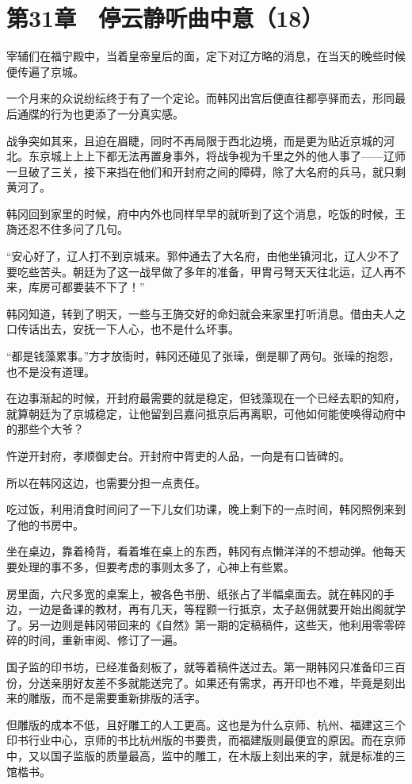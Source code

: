 \section{第31章　停云静听曲中意（18）}

宰辅们在福宁殿中，当着皇帝皇后的面，定下对辽方略的消息，在当天的晚些时候便传遍了京城。

一个月来的众说纷纭终于有了一个定论。而韩冈出宫后便直往都亭驿而去，形同最后通牒的行为也更添了一分真实感。

战争突如其来，且迫在眉睫，同时不再局限于西北边境，而是更为贴近京城的河北。东京城上上上下都无法再置身事外，将战争视为千里之外的他人事了——辽师一旦破了三关，接下来挡在他们和开封府之间的障碍，除了大名府的兵马，就只剩黄河了。

韩冈回到家里的时候，府中内外也同样早早的就听到了这个消息，吃饭的时候，王旖还忍不住多问了几句。

“安心好了，辽人打不到京城来。郭仲通去了大名府，由他坐镇河北，辽人少不了要吃些苦头。朝廷为了这一战早做了多年的准备，甲胄弓弩天天往北运，辽人再不来，库房可都要装不下了！”

韩冈知道，转到了明天，一些与王旖交好的命妇就会来家里打听消息。借由夫人之口传话出去，安抚一下人心，也不是什么坏事。

“都是钱藻累事。”方才放衙时，韩冈还碰见了张璪，倒是聊了两句。张璪的抱怨，也不是没有道理。

在边事渐起的时候，开封府最需要的就是稳定，但钱藻现在一个已经去职的知府，就算朝廷为了京城稳定，让他留到吕嘉问抵京后再离职，可他如何能使唤得动府中的那些个大爷？

忤逆开封府，孝顺御史台。开封府中胥吏的人品，一向是有口皆碑的。

所以在韩冈这边，也需要分担一点责任。

吃过饭，利用消食时间问了一下儿女们功课，晚上剩下的一点时间，韩冈照例来到了他的书房中。

坐在桌边，靠着椅背，看着堆在桌上的东西，韩冈有点懒洋洋的不想动弹。他每天要处理的事不多，但要考虑的事则太多了，心神上有些累。

房里面，六尺多宽的桌案上，被各色书册、纸张占了半幅桌面去。就在韩冈的手边，一边是备课的教材，再有几天，等程颢一行抵京，太子赵佣就要开始出阁就学了。另一边则是韩冈带回来的《自然》第一期的定稿稿件，这些天，他利用零零碎碎的时间，重新审阅、修订了一遍。

国子监的印书坊，已经准备刻板了，就等着稿件送过去。第一期韩冈只准备印三百份，分送亲朋好友差不多就能送完了。如果还有需求，再开印也不难，毕竟是刻出来的雕版，而不是需要重新排版的活字。

但雕版的成本不低，且好雕工的人工更高。这也是为什么京师、杭州、福建这三个印书行业中心，京师的书比杭州版的书要贵，而福建版则最便宜的原因。而在京师中，又以国子监版的质量最高，监中的雕工，在木版上刻出来的字，就是标准的三馆楷书。

